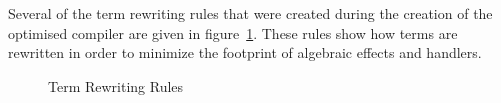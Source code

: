Several of the term rewriting rules that were created during the creation of the optimised compiler are given in figure~\ref{fig:rewriterules}. These rules show how terms are rewritten in order to minimize the footprint of algebraic effects and handlers.

\begin{figure}
\begin{center}
\end{center}

\caption{Term Rewriting Rules \cite{optimization}}\label{fig:rewriterules}
\end{figure}

